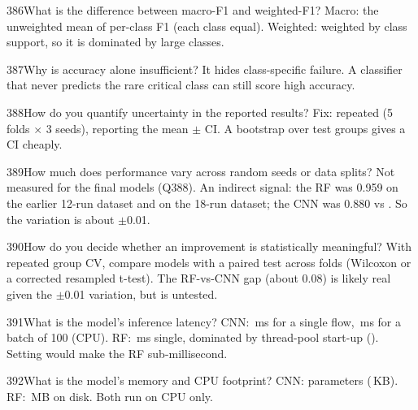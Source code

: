 \begin{qa}{386}{What is the difference between macro-F1 and weighted-F1?}
Macro: the unweighted mean of per-class F1 (each class equal). Weighted: weighted by class support, so it is dominated
by large classes.
\end{qa}

\begin{qa}{387}{Why is accuracy alone insufficient?}
It hides class-specific failure. A classifier that never predicts the rare critical class can still score high
accuracy.
\end{qa}

\begin{qa}{388}{How do you quantify uncertainty in the reported results?}
Fix: repeated  (5 folds $\times$ 3 seeds), reporting the mean $\pm$ CI. A bootstrap over test groups
gives a CI cheaply.
\end{qa}

\begin{qa}{389}{How much does performance vary across random seeds or data splits?}
Not measured for the final models (Q388). An indirect signal: the RF was 0.959 on the earlier 12-run dataset and
\NSnRfFone{} on the 18-run dataset; the CNN was 0.880 vs \NSnCnnFone. So the variation is about $\pm$0.01.
\end{qa}

\begin{qa}{390}{How do you decide whether an improvement is statistically meaningful?}
With repeated group CV, compare models with a paired test across folds (Wilcoxon or a corrected resampled t-test).
The RF-vs-CNN gap (about 0.08) is likely real given the $\pm$0.01 variation, but is untested.
\end{qa}

\begin{qa}{391}{What is the model's inference latency?}
CNN: \NInferCnnMs\,ms for a single flow, \NInferCnnBatchMs\,ms for a batch of 100 (CPU). RF: \NInferRfMs\,ms single,
dominated by thread-pool start-up (). Setting  would make the RF sub-millisecond.
\end{qa}

\begin{qa}{392}{What is the model's memory and CPU footprint?}
CNN: \NCnnParams{} parameters (\NCnnSizeKb\,KB). RF: \NRfSizeMb\,MB on disk. Both run on CPU only.
\end{qa}


